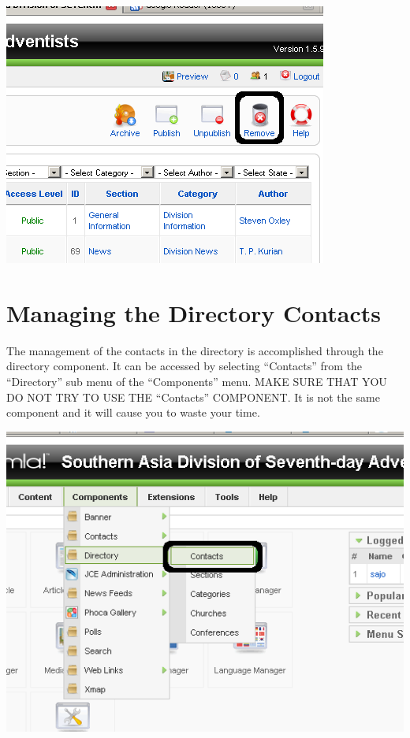 \documentclass[letterpaper,10pt,english]{manual}
\begin{document}
{\hfill\includegraphics{articleFrontPageRemove1.png}\hfill}

\resetcurrentobjects
\hypertarget{--doc-managingDirectoryContacts}{}

\hypertarget{index-55}{}\chapter{Managing the Directory Contacts}

The management of the contacts in the directory is accomplished through the directory component.  It can be accessed by selecting “Contacts” from the “Directory” sub menu of the “Components” menu.  MAKE SURE THAT YOU DO NOT TRY TO USE THE “Contacts” COMPONENT.  It is not the same component and it will cause you to waste your time.

{\hfill\includegraphics{directoryContactsAccess1.png}\hfill}
\end{document}
